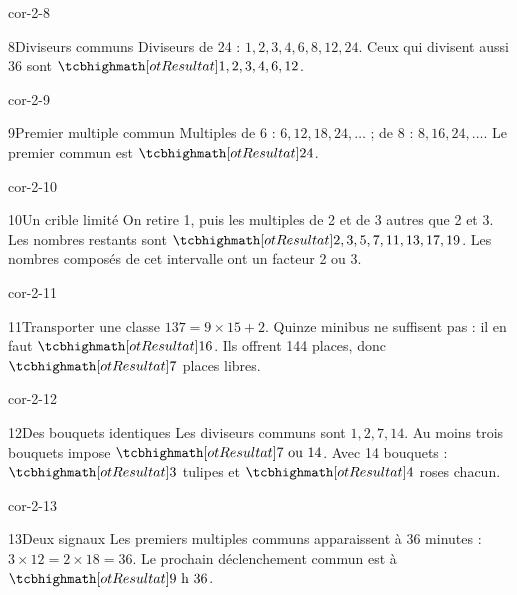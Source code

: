 \begin{blocLivre}{cor-2-8}\begin{corrige}{8}{Diviseurs communs}
Diviseurs de 24 : $1,2,3,4,6,8,12,24$. Ceux qui divisent aussi 36 sont $\res{1,2,3,4,6,12}$.
\end{corrige}\end{blocLivre}
\begin{blocLivre}{cor-2-9}\begin{corrige}{9}{Premier multiple commun}
Multiples de 6 : $6,12,18,24,\ldots$ ; de 8 : $8,16,24,\ldots$. Le premier commun est $\res{24}$.
\end{corrige}\end{blocLivre}
\begin{blocLivre}{cor-2-10}\begin{corrige}{10}{Un crible limité}
On retire 1, puis les multiples de 2 et de 3 autres que 2 et 3. Les nombres restants sont $\res{2,3,5,7,11,13,17,19}$. Les nombres composés de cet intervalle ont un facteur 2 ou 3.
\end{corrige}\end{blocLivre}
\begin{blocLivre}{cor-2-11}\begin{corrige}{11}{Transporter une classe}
$137=9\times15+2$. Quinze minibus ne suffisent pas : il en faut $\res{16}$. Ils offrent 144 places, donc $\res7$ places libres.
\end{corrige}\end{blocLivre}
\begin{blocLivre}{cor-2-12}\begin{corrige}{12}{Des bouquets identiques}
Les diviseurs communs sont $1,2,7,14$. Au moins trois bouquets impose $\res{7\text{ ou }14}$. Avec 14 bouquets : $\res3$ tulipes et $\res4$ roses chacun.
\end{corrige}\end{blocLivre}
\begin{blocLivre}{cor-2-13}\begin{corrige}{13}{Deux signaux}
Les premiers multiples communs apparaissent à 36 minutes : $3\times12=2\times18=36$. Le prochain déclenchement commun est à $\res{9\ \mathrm h\ 36}$.
\end{corrige}\end{blocLivre}
